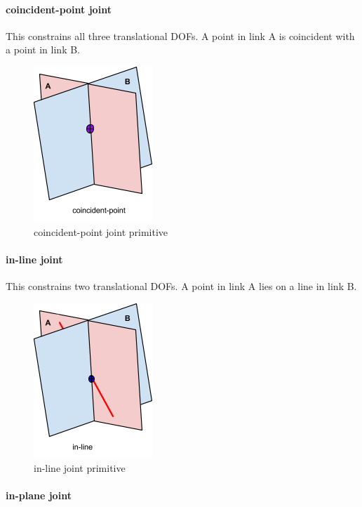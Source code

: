 \documentclass[]{report}
\begin{document}
\paragraph{coincident-point joint}

This constrains all three translational DOFs. 
A point in link A is coincident with a point in link B. 

\begin{figure}[ht!]
	\centering
	\includegraphics[scale=0.7]{images/image06.png}
	\caption{coincident-point joint primitive}
	\label{fig:coincident-point-primitive}
\end{figure}

\paragraph{in-line joint}

This constrains two translational DOFs. 
A point in link A lies on a line in link B. 

\begin{figure}[ht!]
	\centering
	\includegraphics[scale=0.7]{images/image14.png}
	\caption{in-line joint primitive}
    \label{fig:in-line-primitive}
\end{figure}

\paragraph{in-plane joint}
\end{document}
